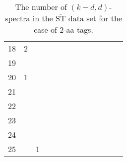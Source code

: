 \documentclass{article}
\def\STbar{{\overline{\mathrm{ST}}}}
\begin{document}
\begin{table}[h]
{\begin{tabular}{|c|c|
c|c|c|c|c|c|c|c|c|c|c|}
18  & 2 &  &  &  &  &  &  &  &  &  &  & \\

19  &  &  &  &  &  &  &  &  &  &  &  & \\

20  & 1 &  &  &  &  &  &  &  &  &  &  & \\

21  &  &  &  &  &  &  &  &  &  &  &  & \\

22  &  &  &  &  &  &  &  &  &  &  &  & \\

23  &  &  &  &  &  &  &  &  &  &  &  & \\

24  &  &  &  &  &  &  &  &  &  &  &  & \\

25  &  & 1 &  &  &  &  &  &  &  &  &  & \\

  \hline
\end{tabular}
\par}
\centering
\caption{The number of $(k-d,d)$-spectra in the $\STbar$ data set for the case of 2-aa tags.}
\vspace{3mm}
\label{table:kd-1-ST}
\end{table}
\end{document}
